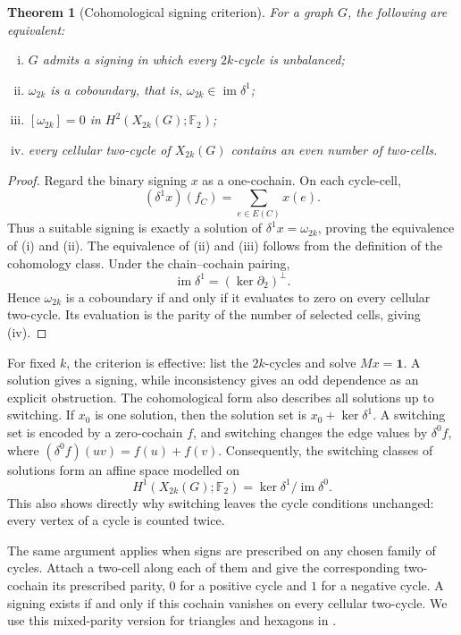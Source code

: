 \documentclass{article}
\newcommand{\FF}{\mathbb{F}}
\newtheorem{theorem}{Theorem}[section]
\theoremstyle{definition}
\theoremstyle{remark}
\begin{document}
\begin{theorem}[Cohomological signing criterion]\label{thm:cohomological-signing}
For a graph $G$, the following are equivalent:
\begin{enumerate}[(i)]
\item $G$ admits a signing in which every $2k$-cycle is unbalanced;
\item $\omega_{2k}$ is a coboundary, that is,
$\omega_{2k}\in\operatorname{im}\delta^1$;
\item $[\omega_{2k}]=0$ in $H^2(X_{2k}(G);\FF_2)$;
\item every cellular two-cycle of $X_{2k}(G)$ contains an even number of
two-cells.
\end{enumerate}
\end{theorem}
\begin{proof}
Regard the binary signing $x$ as a one-cochain.  On each cycle-cell,
\[
(\delta^1x)(f_C)=\sum_{e\in E(C)}x(e).
\]
Thus a suitable signing is exactly a solution of
$\delta^1x=\omega_{2k}$, proving the equivalence of (i) and (ii).
The equivalence of (ii) and (iii) follows from the definition of the
cohomology class.  Under the chain--cochain pairing,
\[
\operatorname{im}\delta^1=(\ker\partial_2)^\perp.
\]
Hence $\omega_{2k}$ is a coboundary if and only if it evaluates to zero
on every cellular two-cycle.  Its evaluation is the parity of the number
of selected cells, giving (iv).
\end{proof}

For fixed $k$, the criterion is effective: list the $2k$-cycles and solve
$Mx=\mathbf1$.  A solution gives a signing, while inconsistency gives
an odd dependence as an explicit obstruction.  The cohomological form
also describes all solutions up to switching.  If $x_0$ is one solution,
then the solution set is $x_0+\ker\delta^1$.  A switching set is encoded
by a zero-cochain $f$, and switching changes the edge values by
$\delta^0f$, where $(\delta^0f)(uv)=f(u)+f(v)$.  Consequently, the
switching classes of solutions form an affine space modelled on
\[
H^1(X_{2k}(G);\FF_2)=\ker\delta^1/\operatorname{im}\delta^0.
\]
This also shows directly why switching leaves the cycle conditions
unchanged: every vertex of a cycle is counted twice.

The same argument applies when signs are prescribed on any chosen family
of cycles.  Attach a two-cell along each of them and give the corresponding
two-cochain its prescribed parity, $0$ for a positive cycle and $1$ for a
negative cycle.  A signing exists if and only if this cochain vanishes on
every cellular two-cycle.  We use this mixed-parity version for triangles
and hexagons in .
\end{document}
